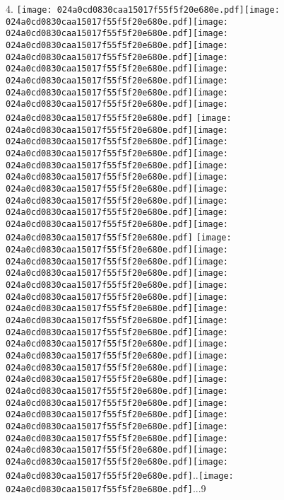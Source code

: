 \documentclass{article}
\newcommand{\origpg}[2]{\texttt{[image: 024a0cd0830caa15017f55f5f20e680e.pdf]}}
\begin{document}
{\vspace{19.754pt}\hspace{36.161pt} 

\vspace{0.626pt}\hspace{18.094pt}4. \origpg2{121.46pt 508.2pt 130.44pt 524.34pt}\hspace{-0.307pt}\origpg2{130.13pt 508.2pt 137.3pt 524.34pt}\origpg2{137.35pt 508.2pt 143.72pt 524.34pt}\hspace{-0.113pt}\origpg2{143.61pt 508.2pt 151.68pt 524.34pt}\hspace{-1.081pt}\origpg2{150.6pt 508.2pt 158.65pt 524.34pt}\origpg2{158.55pt 508.2pt 165.91pt 524.34pt}\hspace{-0.613pt}\origpg2{165.3pt 508.2pt 172.35pt 524.34pt}\hspace{0.161pt}\origpg2{172.52pt 508.2pt 179.68pt 524.34pt}\hspace{-0.42pt}\origpg2{179.26pt 508.2pt 186.32pt 524.34pt}\origpg2{186.25pt 508.2pt 197.1pt 524.34pt} \origpg2{201.22pt 508.2pt 209.34pt 524.34pt}\origpg2{209.39pt 508.2pt 218.02pt 524.34pt}\origpg2{218.02pt 508.2pt 225.19pt 524.34pt}\origpg2{225.27pt 508.2pt 233.32pt 524.34pt}\origpg2{233.23pt 508.2pt 240.39pt 524.34pt}\hspace{-0.178pt}\origpg2{240.22pt 508.2pt 248.85pt 524.34pt}\origpg2{248.85pt 508.2pt 257.49pt 524.34pt}\origpg2{257.55pt 508.2pt 265.62pt 524.34pt}\hspace{-0.113pt}\origpg2{265.51pt 508.2pt 272.13pt 524.34pt}\hspace{-0.597pt}\origpg2{271.53pt 508.2pt 279.6pt 524.34pt} \origpg2{283.57pt 508.2pt 293.79pt 524.34pt}\origpg2{293.69pt 508.2pt 301.76pt 524.34pt}\hspace{-0.597pt}\origpg2{301.16pt 508.2pt 309.38pt 524.34pt}\origpg2{309.38pt 508.2pt 316.54pt 524.34pt}\origpg2{316.54pt 508.2pt 324.6pt 524.34pt}\origpg2{324.53pt 508.2pt 333.17pt 524.34pt}\origpg2{333.17pt 508.2pt 341.24pt 524.34pt}\hspace{0.145pt}\origpg2{341.38pt 508.2pt 349.45pt 524.34pt}\hspace{-0.113pt}\origpg2{349.34pt 508.2pt 356.96pt 524.34pt}\hspace{-0.145pt}\origpg2{356.81pt 508.2pt 363.98pt 524.34pt}\hspace{-0.178pt}\origpg2{363.8pt 508.2pt 372.44pt 524.34pt}\origpg2{372.44pt 508.2pt 381.07pt 524.34pt}\origpg2{381.14pt 508.2pt 388.56pt 524.34pt}\hspace{0.15pt}\origpg2{388.71pt 508.2pt 404.85pt 524.34pt}\hspace{-0.242pt}\origpg2{404.61pt 508.2pt 420.75pt 524.34pt}\origpg2{420.75pt 508.2pt 436.89pt 524.34pt}\origpg2{436.89pt 508.2pt 453.03pt 524.34pt}\hspace{-0.242pt}\origpg2{452.79pt 508.2pt 468.93pt 524.34pt}\origpg2{468.93pt 508.2pt 485.07pt 524.34pt}\origpg2{485.12pt 508.2pt 501.26pt 524.34pt}\hspace{-0.242pt}..\origpg2{509.21pt 508.2pt 525.35pt 524.34pt}\hspace{-0.241pt}...9 

}
\end{document}
